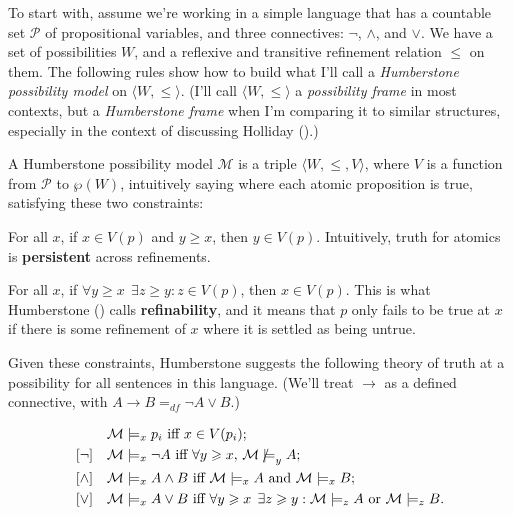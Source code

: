 \documentclass[
  10.5pt,
  twoside]{article}
\providecommand{\tightlist}{%
  \setlength{\itemsep}{0pt}\setlength{\parskip}{0pt}}
\let\olditemize\itemize
\let\endolditemize\enditemize
\renewenvironment{itemize}
  {\vskip 5pt\olditemize}
  {\endolditemize\vskip 5pt}
\newcommand{\nmodels}{\mathrel{\ooalign{$\models$\cr\raisebox{-0.001ex}{\hss$\mkern-1mu/\hss$}\cr}}}
\begin{document}
To start with, assume we're working in a simple language that has a
countable set \(\mathcal{P}\) of propositional variables, and three
connectives: \(\neg\), \(\wedge\), and \(\vee\). We have a set of
possibilities \(W\), and a reflexive and transitive refinement relation
\(\leqslant\) on them. The following rules show how to build what I'll
call a \emph{Humberstone possibility model} on
\mbox{$\langle W, \leqslant \rangle$}. (I'll call
\mbox{$\langle W, \leqslant \rangle$} a \emph{possibility frame} in most
contexts, but a \emph{Humberstone frame} when I'm comparing it to
similar structures, especially in the context of discussing Holliday
().)

A Humberstone possibility model \(\mathcal{M}\) is a triple
\mbox{$\langle W, \leqslant, V \rangle$}, where \(V\) is a function from
\(\mathcal{P}\) to \(\wp(W)\), intuitively saying where each atomic
proposition is true, satisfying these two constraints:

\begin{itemize}
\tightlist
\item
  For all \(x\), if \(x \in V(p)\) and \(y \geqslant x\), then
  \(y \in V(p)\). Intuitively, truth for atomics is \textbf{persistent}
  across refinements.
\item
  For all \(x\), if
  \(\forall y \geqslant x\;\, \exists z \geqslant y: z \in V(p)\), then
  \(x \in V(p)\). This is what Humberstone
  () calls
  \textbf{refinability}, and it means that \(p\) only fails to be true
  at \(x\) if there is some refinement of \(x\) where it is settled as
  being untrue.
\end{itemize}

Given these constraints, Humberstone suggests the following theory of
truth at a possibility for all sentences in this language. (We'll treat
\(\rightarrow\) as a defined connective, with
\(A \rightarrow B =_{df} \neg A \vee B\).)

\begin{align*}
[\text{Vbls}] \quad & \mathcal{M} \models_x p_i \text{ iff } x \in V(p_i); \\
[\neg] \quad & \mathcal{M} \models_x \neg A \text{ iff } \forall y \geqslant x, \, \mathcal{M} \nmodels_y  A; \\
[\wedge] \quad & \mathcal{M} \models_x A \wedge B \text{ iff } \mathcal{M} \models_x A \text{ and } \mathcal{M} \models_x B; \\
[\vee] \quad & \mathcal{M} \models_x A \vee B \text{ iff } \forall y \geqslant x \;\, \exists z \geqslant y : \mathcal{M} \models_z A \text{ or } \mathcal{M} \models_z B.
\end{align*}
\end{document}
